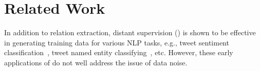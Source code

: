 \section{Related Work}

In addition to relation extraction, %
distant supervision (\DS) is shown to be effective in generating training data for various NLP tasks, e.g., tweet sentiment
classification~\cite{go2009twitter}, tweet named entity classifying~\cite{ritter2011named}, etc.
However, these early applications of \DS do not well address the issue of data noise.


